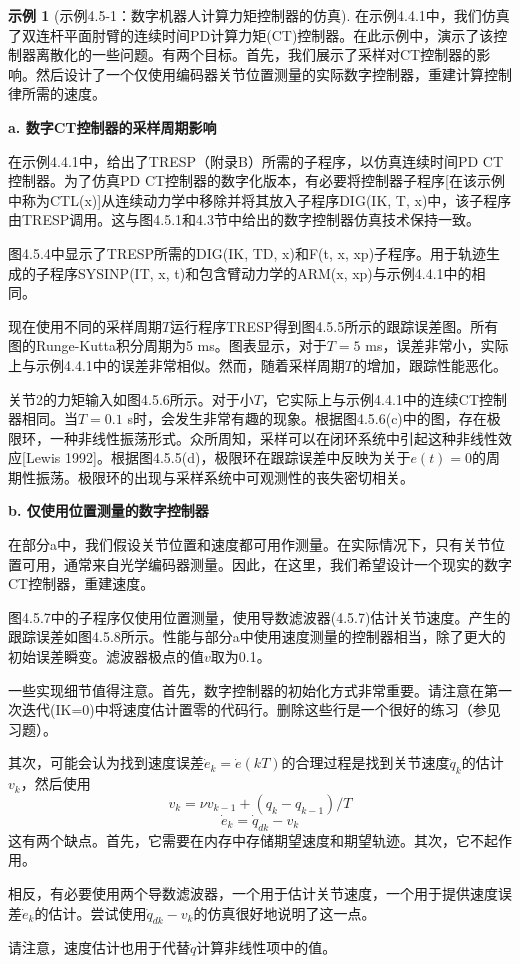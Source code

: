 \documentclass[UTF8]{ctexart}
\theoremstyle{definition}
\newtheorem{example}{示例}[section]
\begin{document}
\begin{example}[示例4.5-1：数字机器人计算力矩控制器的仿真]
在示例4.4.1中，我们仿真了双连杆平面肘臂的连续时间PD计算力矩(CT)控制器。在此示例中，演示了该控制器离散化的一些问题。有两个目标。首先，我们展示了采样对CT控制器的影响。然后设计了一个仅使用编码器关节位置测量的实际数字控制器，重建计算控制律所需的速度。

\textbf{a. 数字CT控制器的采样周期影响}

在示例4.4.1中，给出了TRESP（附录B）所需的子程序，以仿真连续时间PD CT控制器。为了仿真PD CT控制器的数字化版本，有必要将控制器子程序[在该示例中称为CTL(x)]从连续动力学中移除并将其放入子程序DIG(IK, T, x)中，该子程序由TRESP调用。这与图4.5.1和4.3节中给出的数字控制器仿真技术保持一致。

图4.5.4中显示了TRESP所需的DIG(IK, TD, x)和F(t, x, xp)子程序。用于轨迹生成的子程序SYSINP(IT, x, t)和包含臂动力学的ARM(x, xp)与示例4.4.1中的相同。

现在使用不同的采样周期$T$运行程序TRESP得到图4.5.5所示的跟踪误差图。所有图的Runge-Kutta积分周期为5 ms。图表显示，对于$T = 5$ ms，误差非常小，实际上与示例4.4.1中的误差非常相似。然而，随着采样周期$T$的增加，跟踪性能恶化。

关节2的力矩输入如图4.5.6所示。对于小$T$，它实际上与示例4.4.1中的连续CT控制器相同。当$T = 0.1$ s时，会发生非常有趣的现象。根据图4.5.6(c)中的图，存在极限环，一种非线性振荡形式。众所周知，采样可以在闭环系统中引起这种非线性效应[Lewis 1992]。根据图4.5.5(d)，极限环在跟踪误差中反映为关于$e(t) = 0$的周期性振荡。极限环的出现与采样系统中可观测性的丧失密切相关。

\textbf{b. 仅使用位置测量的数字控制器}

在部分a中，我们假设关节位置和速度都可用作测量。在实际情况下，只有关节位置可用，通常来自光学编码器测量。因此，在这里，我们希望设计一个现实的数字CT控制器，重建速度。

图4.5.7中的子程序仅使用位置测量，使用导数滤波器(4.5.7)估计关节速度。产生的跟踪误差如图4.5.8所示。性能与部分a中使用速度测量的控制器相当，除了更大的初始误差瞬变。滤波器极点的值$v$取为0.1。

一些实现细节值得注意。首先，数字控制器的初始化方式非常重要。请注意在第一次迭代(IK=0)中将速度估计置零的代码行。删除这些行是一个很好的练习（参见习题）。

其次，可能会认为找到速度误差$\dot{e}_k = \dot{e}(kT)$的合理过程是找到关节速度$\dot{q}_k$的估计$v_k$，然后使用
\begin{equation*}
    v_k = \nu v_{k-1} + (q_k - q_{k-1})/T
\end{equation*}
\begin{equation*}
    \dot{e}_k = \dot{q}_{dk} - v_k
\end{equation*}
这有两个缺点。首先，它需要在内存中存储期望速度和期望轨迹。其次，它不起作用。

相反，有必要使用两个导数滤波器，一个用于估计关节速度，一个用于提供速度误差$\dot{e}_k$的估计。尝试使用$\dot{q}_{dk} - v_k$的仿真很好地说明了这一点。

请注意，速度估计也用于代替$\dot{q}$计算非线性项中的值。
\end{example}
\end{document}
